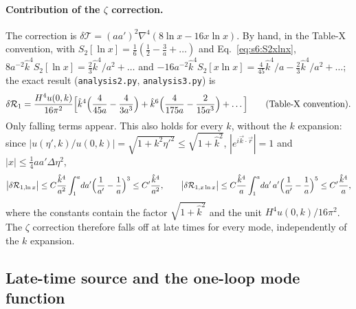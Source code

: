 \documentclass[aps,prd,onecolumn,10pt,nofootinbib,floatfix]{revtex4-2}
\newcommand{\Tab}{\mathcal{T}}
\newcommand{\khat}{\hat k}
\begin{document}
\paragraph*{Contribution of the $\zeta$ correction.}
The correction is $\delta\Tab=(aa')^2\nabla^4(8\ln x-16x\ln x)$. By hand, in the Table-X convention, with
$S_2[\ln x]=\frac16(\frac12-\frac3a+\ldots)$ and Eq.~\eqref{eq:s6:S2xlnx},
$8a^{-2}\khat^4S_2[\ln x]=\frac23\khat^4/a^2+\ldots$ and
$-16a^{-2}\khat^4S_2[x\ln x]=\frac4{45}\khat^4/a-\frac23\khat^4/a^2+\ldots$; the exact result (\texttt{analysis2.py},
\texttt{analysis3.py}) is
\begin{equation}
\delta\sixR_1=\sixunit\Big[\khat^4\Big(\frac4{45a}-\frac4{3a^3}\Big)+\khat^6\Big(\frac4{175a}-\frac2{15a^3}\Big)+\ldots\Big]
\qquad(\text{Table-X convention}).
\label{eq:s6:zeta}
\end{equation}
Only falling terms appear. This also holds for every $k$, without the $k$ expansion: since
$|u(\eta',k)/u(0,k)|=\sqrt{1+k^2\eta'^2}\le\sqrt{1+\khat^2}$, $|e^{i\vec k\cdot\vec r}|=1$ and $|x|\le\frac14aa'\Delta\eta^2$,
\begin{equation}
\big|\delta\sixR_{1,\ln x}\big|\le C\frac{\khat^4}{a^2}\int_1^a\!da'\Big(\frac1{a'}-\frac1a\Big)^3\le C'\frac{\khat^4}{a^2},\qquad
\big|\delta\sixR_{1,x\ln x}\big|\le C\frac{\khat^4}{a}\int_1^a\!da'\,a'\Big(\frac1{a'}-\frac1a\Big)^5\le C'\frac{\khat^4}{a},
\label{eq:s6:bound}
\end{equation}
where the constants contain the factor $\sqrt{1+\khat^2}$ and the unit $H^4u(0,k)/16\pi^2$. The $\zeta$ correction
therefore falls off at late times for every mode, independently of the $k$ expansion.

\subsection{Late-time source and the one-loop mode function}
\label{sec:s6:late}
\end{document}
